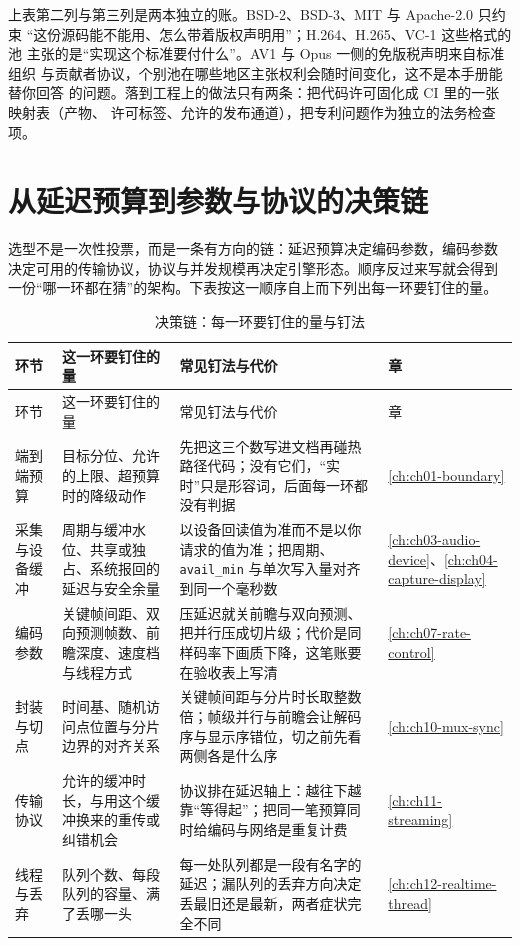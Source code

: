 \documentclass[12pt,a4paper,fontset=fandol]{ctexbook}
\newcommand{\Tp}[1]{\texttt{#1}}
\newcommand{\Bk}{\discretionary{}{}{}}
\begin{document}
\begin{warning}[title={代码许可不等于专利授权}]
上表第二列与第三列是两本独立的账。BSD-2、BSD-3、MIT 与 Apache-2.0 只约束
``这份源码能不能用、怎么带着版权声明用''；H.264、H.265、VC-1 这些格式的池
主张的是``实现这个标准要付什么''。AV1 与 Opus 一侧的免版税声明来自标准组织
与贡献者协议，个别池在哪些地区主张权利会随时间变化，这不是本手册能替你回答
的问题。落到工程上的做法只有两条：把代码许可固化成 CI 里的一张映射表（产物、
许可标签、允许的发布通道），把专利问题作为独立的法务检查项。
\end{warning}

\section{从延迟预算到参数与协议的决策链}

选型不是一次性投票，而是一条有方向的链：延迟预算决定编码参数，编码参数
决定可用的传输协议，协议与并发规模再决定引擎形态。顺序反过来写就会得到
一份``哪一环都在猜''的架构。下表按这一顺序自上而下列出每一环要钉住的量。

\begin{longtable}{>{\raggedright\arraybackslash}p{}
                  >{\raggedright\arraybackslash}p{}
                  >{\raggedright\arraybackslash}p{}
                  >{\raggedright\arraybackslash}p{}}
\caption{决策链：每一环要钉住的量与钉法}\label{tab:apC-chain} \\
\toprule
环节 & 这一环要钉住的量 & 常见钉法与代价 & 章 \\
\midrule
\endfirsthead
\toprule
环节 & 这一环要钉住的量 & 常见钉法与代价 & 章 \\
\midrule
\endhead
\midrule
\endfoot
\bottomrule
\endlastfoot
端到端预算 & 目标分位、允许的上限、超预算时的降级动作 & 先把这三个数写进文档再碰热路径代码；没有它们，``实时''只是形容词，后面每一环都没有判据 & \ref{ch:ch01-boundary} \\
采集与设备缓冲 & 周期与缓冲水位、共享或独占、系统报回的延迟与安全余量 & 以设备回读值为准而不是以你请求的值为准；把周期、\Tp{avail\Bk\_min} 与单次写入量对齐到同一个毫秒数 & \ref{ch:ch03-audio-device}、\ref{ch:ch04-capture-display} \\
编码参数 & 关键帧间距、双向预测帧数、前瞻深度、速度档与线程方式 & 压延迟就关前瞻与双向预测、把并行压成切片级；代价是同样码率下画质下降，这笔账要在验收表上写清 & \ref{ch:ch07-rate-control} \\
封装与切点 & 时间基、随机访问点位置与分片边界的对齐关系 & 关键帧间距与分片时长取整数倍；帧级并行与前瞻会让解码序与显示序错位，切之前先看两侧各是什么序 & \ref{ch:ch10-mux-sync} \\
传输协议 & 允许的缓冲时长，与用这个缓冲换来的重传或纠错机会 & 协议排在延迟轴上：越往下越靠``等得起''；把同一笔预算同时给编码与网络是重复计费 & \ref{ch:ch11-streaming} \\
线程与丢弃 & 队列个数、每段队列的容量、满了丢哪一头 & 每一处队列都是一段有名字的延迟；漏队列的丢弃方向决定丢最旧还是最新，两者症状完全不同 & \ref{ch:ch12-realtime-thread} \\
\end{longtable}
\end{document}
